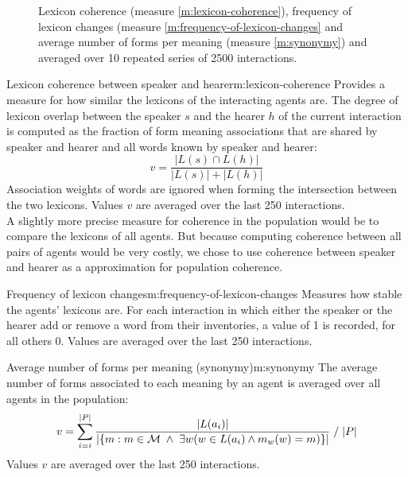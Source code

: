 \begin{figure}[p]
  \caption{Lexicon coherence (measure \ref{m:lexicon-coherence}),
    frequency of lexicon changes (measure
    \ref{m:frequency-of-lexicon-changes} and average number of forms
    per meaning (measure \ref{m:synonymy}) and averaged over 10
    repeated series of 2500 interactions.}
  \label{f:ng-synonymy+coherence}
\end{figure}


\begin{measure}[p]{Lexicon coherence between speaker and
    hearer}{m:lexicon-coherence}
  Provides a measure for how similar the lexicons of the interacting
  agents are. The degree of lexicon overlap between the speaker $s$
  and the hearer $h$ of the current interaction is computed as the
  fraction of form meaning associations that are shared by speaker and
  hearer and all words known by speaker and hearer:
  $$v=\frac{|L(s) \cap L(h)|}{|L(s)| + |L(h)|}$$
  Association weights of words are ignored when forming the
  intersection between the two lexicons. Values $v$ are averaged over
  the last 250 interactions.\\

  A slightly more precise measure for coherence in the population
  would be to compare the lexicons of all agents. But because
  computing coherence between all pairs of agents would be very
  costly, we chose to use coherence between speaker and hearer as a
  approximation for population coherence.
\end{measure}


\begin{measure}[p]{Frequency of lexicon changes}{m:frequency-of-lexicon-changes}
  Measures how stable the agents' lexicons are. For each interaction
  in which either the speaker or the hearer add or remove a word from
  their inventories, a value of 1 is recorded, for all others
  0. Values are averaged over the last 250 interactions.
\end{measure}


\begin{measure}[p]{Average number of forms per meaning (synonymy)}{m:synonymy}
  The average number of forms associated to each meaning by an agent
  is averaged over all agents in the population:
  $$v = \sum_{i=i}^{|P|}{\frac{|L(a_i)|}{|\{m:m \in {\cal M}\;\wedge\;\exists w ( w \in L(a_i) \wedge m_w(w) = m)  \}|}}\;/\;|P|$$
  Values $v$ are averaged over the last 250 interactions.
\end{measure}

